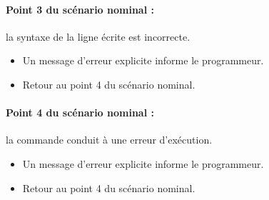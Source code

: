 \documentclass[12pt,a4paper]{article}
\begin{document}
        \paragraph{Point 3 du scénario nominal :} la syntaxe de la ligne écrite est incorrecte.
        \begin{itemize}
            \item Un message d'erreur explicite informe le programmeur.
            \item Retour au point 4 du scénario nominal.
        \end{itemize}

        \paragraph{Point 4 du scénario nominal :} la commande conduit à une erreur d'exécution.
        \begin{itemize}
            \item Un message d'erreur explicite informe le programmeur.
            \item Retour au point 4 du scénario nominal.
        \end{itemize}
\end{document}
